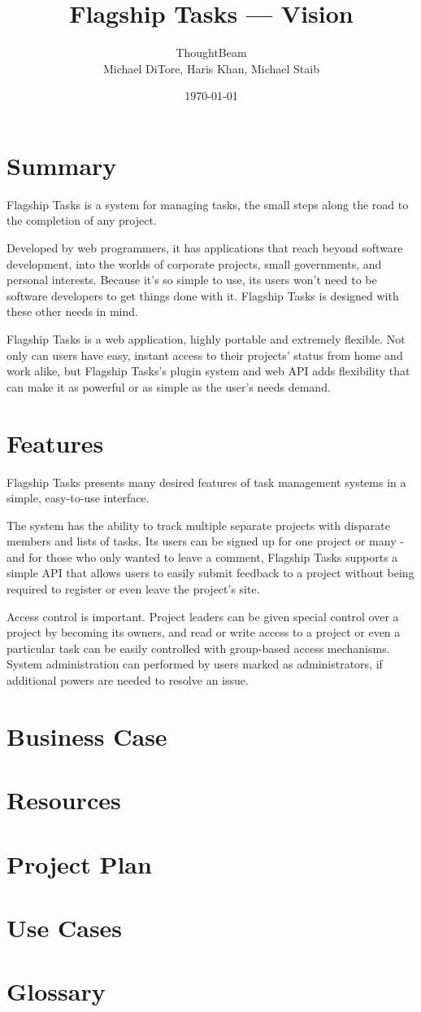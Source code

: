 \documentclass[letterpaper]{article}
\title{Flagship Tasks --- Vision}
\author{ThoughtBeam\\Michael DiTore, Haris Khan, Michael Staib}
\date{\today}
\begin{document}
	\maketitle
	\section{Summary}
		Flagship Tasks is a system for managing tasks, the small steps along the road to the completion of any project.

		Developed by web programmers, it has applications that reach beyond software development, into the worlds of corporate projects, small governments, and personal interests. Because it's so simple to use, its users won't need to be software developers to get things done with it. Flagship Tasks is designed with these other needs in mind.

		Flagship Tasks is a web application, highly portable and extremely flexible. Not only can users have easy, instant access to their projects' status from home and work alike, but Flagship Tasks's plugin system and web API adds flexibility that can make it as powerful or as simple as the user's needs demand.
	\section{Features}
		Flagship Tasks presents many desired features of task management systems in a simple, easy-to-use interface.

		The system has the ability to track multiple separate projects with disparate members and lists of tasks. Its users can be signed up for one project or many - and for those who only wanted to leave a comment, Flagship Tasks supports a simple API that allows users to easily submit feedback to a project without being required to register or even leave the project's site. 

		Access control is important. Project leaders can be given special control over a project by becoming its owners, and read or write access to a project or even a particular task can be easily controlled with group-based access mechanisms. System administration can performed by users marked as administrators, if additional powers are needed to resolve an issue.
	\section{Business Case}
	\section{Resources}
	\section{Project Plan}
	\section{Use Cases}
	\section{Glossary}
\end{document}
